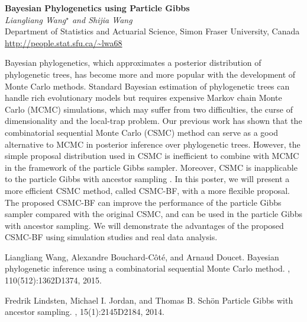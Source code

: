 \documentclass[12pt]{article}
\newcommand{\postertitle}[1]{{\Large\bf #1}\\[12pt]}
\newcommand{\authors}[1]{\emph{#1}\\}
\newcommand{\affiliations}[1]{{#1}\\}
\newcommand{\contacts}[1]{{#1}}
\begin{document}
\begin{center}
\vspace*{0.5cm}
%
\postertitle{Bayesian Phylogenetics using Particle Gibbs}
%
\authors{Liangliang Wang$^\star$ and Shijia Wang} %
% 
\affiliations{Department of Statistics and Actuarial Science, Simon Fraser University, Canada}
%
\contacts{\url{http://people.stat.sfu.ca/~lwa68}} %
%
\vspace*{0.3cm}
\end{center}

Bayesian phylogenetics, which approximates a posterior distribution of phylogenetic trees, has become more and more popular with the development of Monte Carlo methods. Standard Bayesian estimation of phylogenetic trees can handle rich evolutionary models but requires expensive Markov chain Monte Carlo (MCMC) simulations, which may suffer from two difficulties, the curse of dimensionality and the local-trap problem. Our previous work  \cite{Wang2015} has shown that the combinatorial sequential Monte Carlo (CSMC) method can serve as a good alternative to MCMC in posterior inference over phylogenetic trees. However, the simple proposal distribution used in CSMC is inefficient to combine with MCMC in the framework of the particle Gibbs sampler. Moreover, CSMC is inapplicable to the particle Gibbs with ancestor sampling \cite{Lindsten2014}. In this poster, we will present a more efficient CSMC method, called CSMC-BF,  with a more flexible proposal. The proposed CSMC-BF can improve the performance of the particle Gibbs sampler compared with the original CSMC, and can be used in the particle Gibbs with ancestor sampling.  We will demonstrate the advantages of the proposed CSMC-BF using simulation studies and real data analysis. 



\begin{thebibliography}{1}	
	Liangliang Wang, Alexandre Bouchard-C\^{o}t\'{e}, and Arnaud Doucet.
	\newblock Bayesian phylogenetic inference using a combinatorial sequential Monte Carlo method.
	, 110(512):1362D1374, 2015.	
	
	Fredrik Lindsten, Michael I. Jordan, and Thomas B. Sch\"on
	\newblock Particle Gibbs with ancestor sampling.
	, 15(1):2145D2184, 2014.	
\end{thebibliography}
\end{document}
